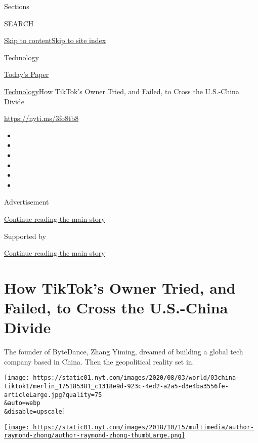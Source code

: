 Sections

SEARCH

\protect\hyperlink{site-content}{Skip to
content}\protect\hyperlink{site-index}{Skip to site index}

\href{https://www.nytimes.com/section/technology}{Technology}

\href{https://myaccount.nytimes.com/auth/login?response_type=cookie\&client_id=vi}{}

\href{https://www.nytimes.com/section/todayspaper}{Today's Paper}

\href{/section/technology}{Technology}\textbar{}How TikTok's Owner
Tried, and Failed, to Cross the U.S.-China Divide

\url{https://nyti.ms/3fo8tb8}

\begin{itemize}
\item
\item
\item
\item
\item
\item
\end{itemize}

Advertisement

\protect\hyperlink{after-top}{Continue reading the main story}

Supported by

\protect\hyperlink{after-sponsor}{Continue reading the main story}

\hypertarget{how-tiktoks-owner-tried-and-failed-to-cross-the-us-china-divide}{%
\section{How TikTok's Owner Tried, and Failed, to Cross the U.S.-China
Divide}\label{how-tiktoks-owner-tried-and-failed-to-cross-the-us-china-divide}}

The founder of ByteDance, Zhang Yiming, dreamed of building a global
tech company based in China. Then the geopolitical reality set in.

\texttt{[image: https://static01.nyt.com/images/2020/08/03/world/03china-tiktok1/merlin\_175185381\_c1318e9d-923c-4ed2-a2a5-d3e4ba3556fe-articleLarge.jpg?quality=75\\\&auto=webp\\\&disable=upscale]}

\href{https://www.nytimes.com/by/raymond-zhong}{\texttt{[image: https://static01.nyt.com/images/2018/10/15/multimedia/author-raymond-zhong/author-raymond-zhong-thumbLarge.png]}}

